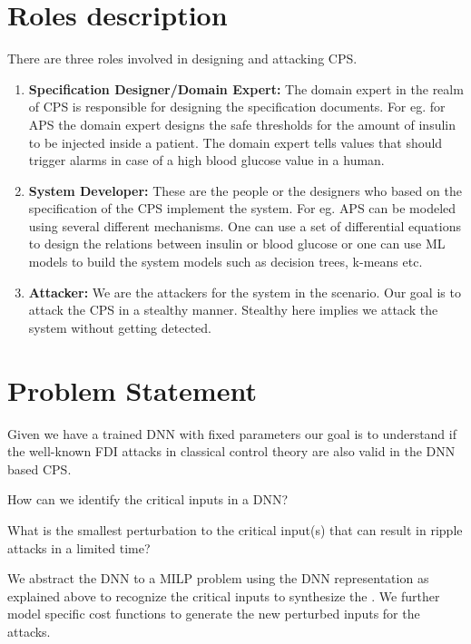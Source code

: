 \section{Roles description}
There are three roles involved in designing and attacking \ac{CPS}.

\begin{enumerate}
	\item \textbf{Specification Designer/Domain Expert:} The domain expert in the realm of \ac{CPS} is responsible for designing the specification documents. For eg. for \ac{APS} the domain expert designs the safe thresholds for the amount of insulin to be injected inside a patient. The domain expert tells values that should trigger alarms in case of a high blood glucose value in a human. 
	
	\item \textbf{System Developer:} These are the people or the designers who based on the specification of the CPS implement the system. For eg. \ac{APS} can be modeled using several different mechanisms. One can use a set of differential equations to design the relations between insulin or blood glucose or one can use \ac{ML} models to build the system models such as decision trees, k-means etc. 
	
	\item \textbf{Attacker:} We are the attackers for the system in the scenario. Our goal is to attack the \ac{CPS} in a stealthy manner. Stealthy here implies we attack the system without getting detected. 
\end{enumerate}



\section{Problem Statement}

Given we have a trained DNN with fixed parameters our goal is to understand if the well-known FDI attacks in classical control theory are also valid in the DNN based CPS.
\begin{problem}
	How can we identify the critical inputs in a DNN?
\end{problem}


\begin{problem}
	What is the smallest perturbation to the critical input(s) that can result in ripple attacks in a limited time?
\end{problem}

\begin{approach*}
	We abstract the DNN to a MILP problem using the DNN representation as explained above to recognize the critical inputs to synthesize the \attack. We further model \attack specific cost functions to generate the new perturbed inputs for the attacks. 
\end{approach*}
